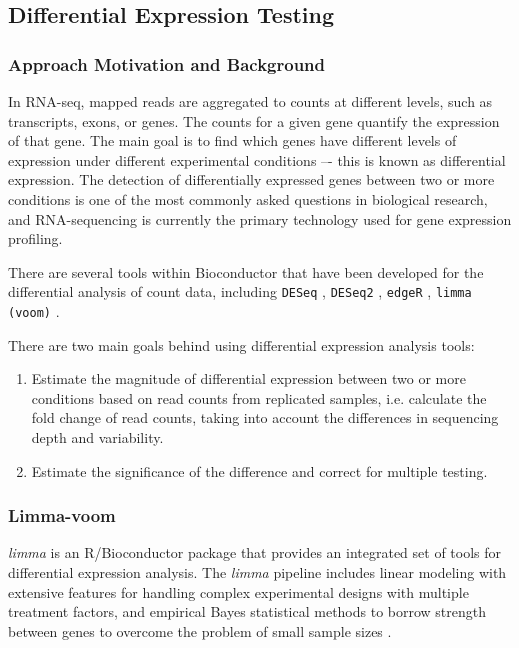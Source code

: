     \subsection{Differential Expression Testing}
    \subsubsection{Approach Motivation and Background}
    In RNA-seq, mapped reads are aggregated to counts at different levels, such as transcripts, exons, or genes. The counts for a given gene quantify the expression of that gene. The main goal is to find which genes have different levels of expression under different experimental conditions –- this is known as differential expression.
    The detection of differentially expressed genes between two or more conditions is one of the most commonly asked questions in biological research, and RNA-sequencing is currently the primary technology used for gene expression profiling.

    There are several tools within Bioconductor that have been developed for the differential analysis of count data, including \texttt{DESeq} \cite{anders2010differential}, \texttt{DESeq2} \cite{love2014moderated}, \texttt{edgeR} \cite{Robinson2010EdgeR:Data}, \texttt{limma (voom)} \cite{Ritchie2015LimmaStudies}.

    There are two main goals behind using differential expression analysis tools:
    \begin{enumerate}
    \item Estimate the magnitude of differential expression between two or more conditions based on read counts from replicated samples, i.e. calculate the fold change of read counts, taking into account the differences in sequencing depth and variability.
    \item Estimate the significance of the difference and correct for multiple testing.
    \end{enumerate}

        
        \subsubsection{Limma-voom}
        \textit{limma} is an R/Bioconductor package \cite{Ritchie2015LimmaStudies, smyth2004linear}  that provides an integrated set of tools for differential expression analysis. The \textit{limma} pipeline includes linear modeling with extensive features for handling complex experimental designs with multiple treatment factors, and empirical Bayes statistical methods to borrow strength between genes to overcome the problem of small sample sizes \cite{Ritchie2015LimmaStudies}.

